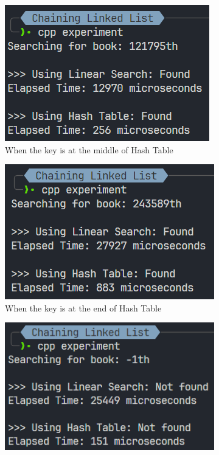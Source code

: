 \begin{itemize}
\begin{figure}[!ht]
\begin{subfigure}{0.45\textwidth}
			      \centering
			      \includegraphics[width=\textwidth]{imgs/Chaining Linked List/mid.png}
			      \caption{When the key is at the middle of Hash Table}\label{fig:chainingll-mid-metric}
		      \end{subfigure}
		      \hfill
		      \begin{subfigure}{0.45\textwidth}
			      \centering
			      \includegraphics[width=\textwidth]{imgs/Chaining Linked List/end.png}
			      \caption{When the key is at the end of Hash Table}\label{fig:chainingll-end-metric}
		      \end{subfigure}
		      \hfill
		      \begin{subfigure}{0.45\textwidth}
			      \centering
			      \includegraphics[width=\textwidth]{imgs/Chaining Linked List/not-found.png}

\end{subfigure}
\end{figure}
\end{itemize}
